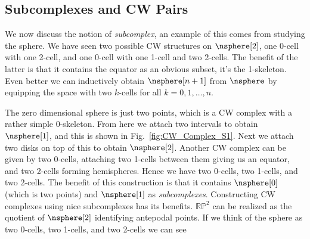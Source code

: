     \subsection{Subcomplexes and CW Pairs}
        \begin{minipage}[t]{0.6\textwidth}
            We now discuss the notion of \textit{subcomplex}, an example
            of this comes from studying the sphere. We have seen two
            possible CW structures on $\nsphere[2]$, one 0-cell with one
            2-cell, and one 0-cell with one 1-cell and two 2-cells.
            The benefit of the latter is that it contains the equator as
            an obvious subset, it's the 1-skeleton. Even better we can
            inductively obtain $\nsphere[n+1]$ from $\nsphere$ by
            equipping the space with two $k$-cells for all
            $k=0,1,\dots,n$.
        \end{minipage}
        \hfill
        \par\vspace{2.5ex}
        The zero dimensional sphere is just two points, which is a CW
        complex with a rather simple 0-skeleton. From here we attach two
        intervals to obtain $\nsphere[1]$, and this is shown in
        Fig.~\ref{fig:CW_Complex_S1}. Next we attach two disks on top of
        this to obtain $\nsphere[2]$. Another CW complex can be given by
        two 0-cells, attaching two 1-cells between them giving us an
        equator, and two 2-cells forming hemispheres. Hence we have two
        0-cells, two 1-cells, and two 2-cells. The benefit of this
        construction is that it contains $\nsphere[0]$ (which is two
        points) and $\nsphere[1]$ as \textit{subcomplexes}. Constructing
        CW complexes using nice subcomplexes has its benefits.
        $\mathbb{RP}^{2}$ can be realized as the quotient of
        $\nsphere[2]$ identifying antepodal points. If we think of the
        sphere as two 0-cells, two 1-cells, and two 2-cells we can see

